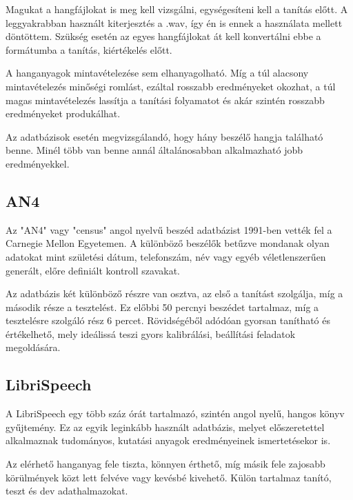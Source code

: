Magukat a hangfájlokat is meg kell vizsgálni, egységesíteni kell a tanítás előtt. A leggyakrabban használt kiterjesztés a .wav, így én is ennek a használata mellett döntöttem. Szükség esetén az egyes hangfájlokat át kell konvertálni ebbe a formátumba a tanítás, kiértékelés előtt.

A hanganyagok mintavételezése sem elhanyagolható. Míg a túl alacsony mintavételezés minőségi romlást, ezáltal rosszabb eredményeket okozhat, a túl magas mintavételezés lassítja a tanítási folyamatot és akár szintén rosszabb eredményeket produkálhat.

Az adatbázisok esetén megvizsgálandó, hogy hány beszélő hangja található benne. Minél több van benne annál általánosabban alkalmazható jobb eredményekkel.

\subsection{AN4}

Az "AN4" vagy "census" angol nyelvű beszéd adatbázist 1991-ben vették fel a Carnegie Mellon Egyetemen. A különböző beszélők betűzve mondanak olyan adatokat mint születési dátum, telefonszám, név vagy egyéb véletlenszerűen generált, előre definiált kontroll szavakat.


Az adatbázis két különböző részre van osztva, az első a tanítást szolgálja, míg a második része a tesztelést. Ez előbbi 50 percnyi beszédet tartalmaz, míg a tesztelésre szolgáló rész 6 percet. Rövidségéből adódóan gyorsan tanítható és értékelhető, mely ideálissá teszi gyors kalibrálási, beállítási feladatok megoldására.

\subsection{LibriSpeech}

A LibriSpeech egy több száz órát tartalmazó, szintén angol nyelű, hangos könyv gyűjtemény. Ez az egyik leginkább használt adatbázis, melyet előszeretettel alkalmaznak tudományos, kutatási anyagok eredményeinek ismertetésekor is.

Az elérhető hanganyag fele tiszta, könnyen érthető, míg másik fele zajosabb körülmények közt lett felvéve vagy kevésbé kivehető. Külön tartalmaz tanító, teszt és dev adathalmazokat.

